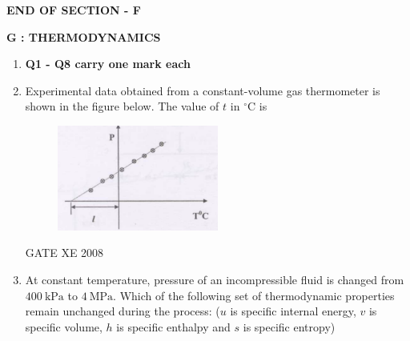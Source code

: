 \documentclass[12pt]{article}
\begin{document}
\begin{center}
    \textbf{END OF SECTION - F}
\end{center}

\newpage

\begin{center}
    \textbf{\Large G : THERMODYNAMICS}
\end{center}

\begin{enumerate}[label=Q\arabic*.]
\item[] \textbf{Q1 - Q8 carry one mark each}

\item Experimental data obtained from a constant-volume gas thermometer is shown in the figure below. The value of $t$ in $^\circ$C is  

    \begin{figure}[H]
    \centering
    \includegraphics[width=0.5\textwidth]{figs/ass1_g_q1.png}
    \caption{}
    \end{figure}
\begin{enumerate}[label=(\Alph*)]
\end{enumerate}

GATE XE 2008

\item At constant temperature, pressure of an incompressible fluid is changed from $400\ \mathrm{kPa}$ to $4\ \mathrm{MPa}$. Which of the following set of thermodynamic properties remain unchanged during the process: ($u$ is specific internal energy, $v$ is specific volume, $h$ is specific enthalpy and $s$ is specific entropy)  

\begin{enumerate}[label=(\Alph*)]
\end{enumerate}


\end{enumerate}
\end{document}
